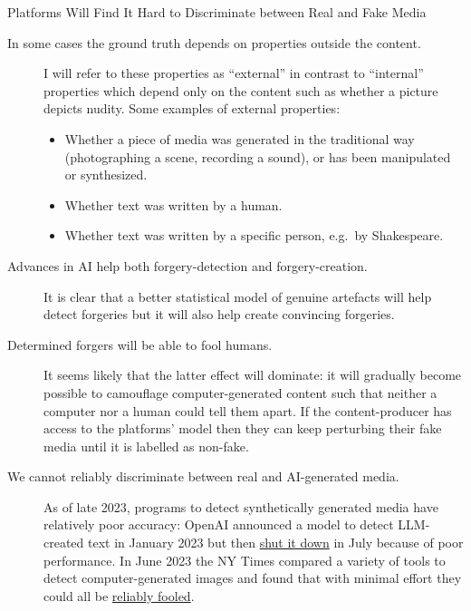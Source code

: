 \documentclass[
  10pt,
  ignorenonframetext,
]{beamer}
\providecommand{\tightlist}{%
  \setlength{\itemsep}{0pt}\setlength{\parskip}{0pt}}\usepackage{longtable,booktabs,array}
\begin{document}
\begin{frame}{Platforms Will Find It Hard to Discriminate between Real
and Fake Media}
\label{platforms-will-find-it-hard-to-discriminate-between-real-and-fake-media}
\begin{description}
\item[In some cases the ground truth depends on properties outside the
content.]
I will refer to these properties as ``external'' in contrast to
``internal'' properties which depend only on the content such as whether
a picture depicts nudity. Some examples of external properties:

\begin{itemize}
\tightlist
\item
  Whether a piece of media was generated in the traditional way
  (photographing a scene, recording a sound), or has been manipulated or
  synthesized.
\item
  Whether text was written by a human.
\item
  Whether text was written by a specific person, e.g.~by Shakespeare.
\end{itemize}
\item[Advances in AI help both forgery-detection and forgery-creation.]
It is clear that a better statistical model of genuine artefacts will
help detect forgeries but it will also help create convincing forgeries.
\end{description}
\end{frame}

\begin{frame}{}
\label{section-10}
\begin{description}
\item[Determined forgers will be able to fool humans.]
It seems likely that the latter effect will dominate: it will gradually
become possible to camouflage computer-generated content such that
neither a computer nor a human could tell them apart. If the
content-producer has access to the platforms' model then they can keep
perturbing their fake media until it is labelled as non-fake.
\item[We cannot reliably discriminate between real and AI-generated
media.]
As of late 2023, programs to detect synthetically generated media have
relatively poor accuracy: OpenAI announced a model to detect LLM-created
text in January 2023 but then
\href{https://decrypt.co/149826/openai-quietly-shutters-its-ai-detection-tool}{shut
it down} in July because of poor performance. In June 2023 the NY Times
compared a variety of tools to detect computer-generated images and
found that with minimal effort they could all be
\href{https://www.nytimes.com/interactive/2023/06/28/technology/ai-detection-midjourney-stable-diffusion-dalle.html}{reliably
fooled}.
\end{description}
\end{frame}
\end{document}
